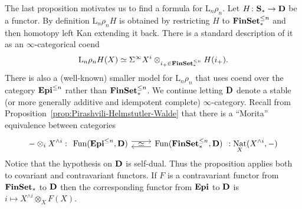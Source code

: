 \documentclass[psamsfonts]{amsart}
\theoremstyle{plain}
\theoremstyle{definition}
\theoremstyle{remark}
\newcommand{\catname}[1]{{\normalfont\textbf{#1}}}
\newcommand{\finset}{\catname{FinSet}_*}
\newcommand{\epi}{\catname{Epi}}
\newcommand{\spaces}{\catname{S}_*}
\newcommand{\lkan}{\mathrm{L}}
\DeclareMathOperator{\nat}{Nat}
\DeclareMathOperator{\fun}{Fun}
\begin{document}
The last proposition motivates us to find a formula for $\lkan_n\rho_n$. Let $H\colon \spaces\to \catname{D}$ be a functor. By definition $\lkan_n \rho_nH$ is obtained by restricting $H$ to $\finset^{\le n}$ and then homotopy left Kan extending it back. There is a standard description of it as an $\infty$-categorical coend
\begin{equation}\label{eq:coend kan extension}
\lkan_n\rho_n H(X)\simeq \Sigma^\infty X^i \otimes_{i_+\in \finset^{\le n}} H(i_+).
\end{equation}
There is also a (well-known) smaller model for $\lkan_n\rho_n$ that uses coend over the category $\epi^{\le n}$ rather than $\finset^{\le n}$. We continue letting $\catname{D}$ denote a stable (or more generally additive and idempotent complete) $\infty$-category. 
Recall from Proposition~\ref{prop:Pirashvili-Helmstutler-Walde} that there is a ``Morita'' equivalence between categories
\[
-\otimes_{i} X^{\wedge i} : \begin{tikzcd}
           \fun(\epi^{\le n}, \catname{D})
           \arrow[r, shift left=.75ex]
            \arrow[r, phantom, "\simeq"] 
           &  \fun(\finset^{\le n}, \catname{D})
           \arrow[l, shift left=.75ex]      
        \end{tikzcd}  : \nat_X(X^{\wedge i}, -)
\]
Notice that the hypothesis on $\catname{D}$ is self-dual. Thus the proposition applies both to covariant and contravariant functors. If $F$ is a contravariant functor from $\finset$ to $\catname{D}$ then the corresponding functor from $\epi$ to $\catname{D}$ is $i\mapsto X^{\wedge i}\otimes_X F(X)$.
\end{document}
